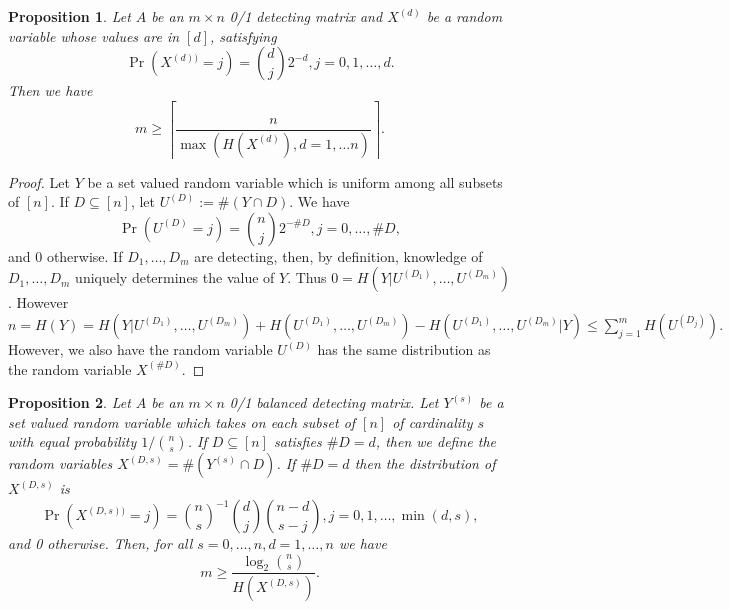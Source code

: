 \documentclass{article}
\newtheorem{proposition}{Proposition}
\begin{document}
\begin{proposition}
  Let $A$ be an $m \times n$ 0/1 detecting matrix and
  $X^{(d)}$ be a random variable whose values are in $[d]$, satisfying
  \begin{displaymath}
    \Pr(X^{(d))} = j) = \binom{d}{j} 2^{-d}, j=0, 1, \dots, d.
  \end{displaymath}
Then we have
  \begin{equation}
    \label{eq:pippenger}
    m \ge \left \lceil \frac{n}{\max(H(X^{(d)}), d = 1, \dots n)}
    \right \rceil.
  \end{equation}
\end{proposition}
\begin{proof}
  Let $Y$ be a set valued random variable which is uniform
  among all subsets of $[n]$.  If $D \subseteq [n]$, let $U^{(D)} := \#(Y
  \cap D)$.  We have
  \begin{displaymath}
    \Pr(U^{(D)} = j) = \binom{n}{j} 2^{-\#D}, j=0, \dots, \#D,
  \end{displaymath}
  and 0 otherwise.  If $D_1, \dots, D_m$ are detecting, then, by
  definition, knowledge of $D_1, \dots, D_m$ uniquely determines the
  value of $Y$.  Thus $0 = H(Y | U^{(D_1)}, \dots, U^{(D_m)})$.
  However $n = H(Y) = H(Y | U^{(D_1)}, \dots, U^{(D_m)}) +
  H(U^{(D_1)}, \dots, U^{(D_m)}) - H(U^{(D_1)},
  \dots, U^{(D_m)} | Y) \le \sum_{j=1}^m H(U^{(D_j)}).$
  However, we also have the random variable $U^{(D)}$ has the same
  distribution as the random variable $X^{(\#D)}$.
\end{proof}
\begin{proposition}
  Let $A$ be an $m \times n$ 0/1 balanced detecting matrix.
  Let $Y^{(s)}$ be a set valued random variable which takes on each subset
  of $[n]$ of cardinality $s$ with equal probability $1/\binom{n}{s}$.
  If $D \subseteq [n]$ satisfies $\# D = d$, then we define the random
  variables $X^{(D,s)} = \# (Y^{(s)} \cap D)$.
  If $\#D = d$ then the distribution of $X^{(D,s)}$ is
  \begin{displaymath}
    \Pr(X^{(D,s))} = j) = \binom{n}{s}^{-1}\binom{d}{j}
    \binom{n-d}{s - j}, j=0, 1, \dots, \min(d,s),
  \end{displaymath}
  and 0 otherwise.
  Then, for all $s = 0, \dots, n, d=1, \dots, n$ we have
  \begin{equation}
    \label{eq:better}
    m \ge \frac{\log_2 \binom{n}{s}}{H(X^{(D,s)})}.
  \end{equation}
\end{proposition}
\end{document}
